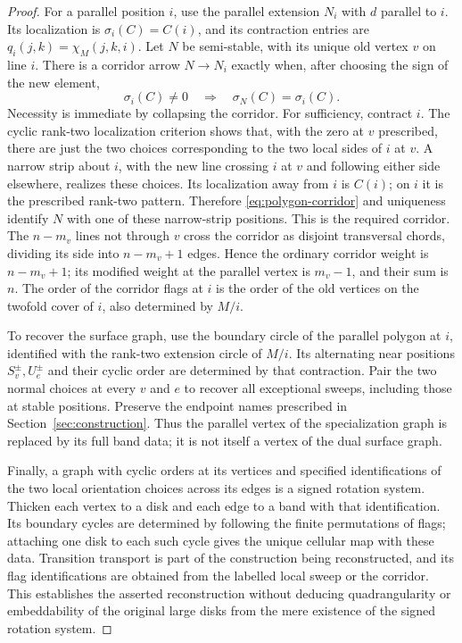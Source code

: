 \begin{proof}
For a parallel position $i$, use the parallel extension
$N_i$ with $d$ parallel to $i$.  Its localization is
$\sigma_i(C)=C(i)$, and its contraction entries are
$q_i(j,k)=\chi_M(j,k,i)$.  Let $N$ be semi-stable, with its unique old
vertex $v$ on line $i$.  There is a corridor arrow $N\to N_i$ exactly
when, after choosing the sign of the new element,
\[
          \sigma_i(C)\ne0 \quad\Longrightarrow\quad
          \sigma_N(C)=\sigma_i(C) .                     \label{eq:polygon-corridor}
\]
Necessity is immediate by collapsing the corridor.  For sufficiency,
contract $i$.  The cyclic rank-two localization criterion shows that,
with the zero at $v$ prescribed, there are just the two choices
corresponding to the two local sides of $i$ at $v$.  A narrow strip
about $i$, with the new line crossing $i$ at $v$ and following either
side elsewhere, realizes these choices.  Its localization away from
$i$ is $C(i)$; on $i$ it is the prescribed rank-two pattern.
Therefore \eqref{eq:polygon-corridor} and uniqueness identify $N$ with one
of these narrow-strip positions.  This is the required corridor.
The $n-m_v$ lines not through $v$ cross the corridor as disjoint
transversal chords, dividing its side into $n-m_v+1$ edges.  Hence
the ordinary corridor weight is $n-m_v+1$; its modified weight at
the parallel vertex is $m_v-1$, and their sum is $n$.
The order of the corridor flags at $i$ is the order of the old
vertices on the twofold cover of $i$, also determined by $M/i$.

To recover the surface graph, use the boundary circle of the parallel
polygon at $i$, identified with the rank-two extension circle of $M/i$.
Its alternating near positions $S_v^\pm,U_e^\pm$ and their cyclic
order are determined by that contraction. Pair the two normal choices
at every $v$ and $e$ to recover all exceptional sweeps, including
those at stable positions. Preserve the endpoint names prescribed in
Section~\ref{sec:construction}. Thus the parallel vertex of the
specialization graph is replaced by its full band data; it is not
itself a vertex of the dual surface graph.

Finally, a graph with cyclic orders at its vertices and specified
identifications of the two local orientation choices across its edges
is a signed rotation system.  Thicken each vertex to a disk and each
edge to a band with that identification.  Its boundary cycles are
determined by following the finite permutations of flags; attaching
one disk to each such cycle gives the unique cellular map with these
data.  Transition transport is part of the construction being
reconstructed, and its flag identifications are obtained from the
labelled local sweep or the corridor.  This establishes the asserted
reconstruction without deducing quadrangularity or embeddability of
the original large disks from the mere existence of the signed
rotation system.
\end{proof}


